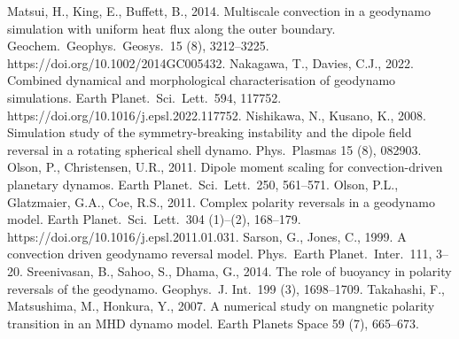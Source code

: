 \begin{thebibliography}{}
%
%
Matsui, H., King, E., Buffett, B., 2014. Multiscale convection in a geodynamo simulation with uniform heat flux along the outer boundary. Geochem.\ Geophys.\ Geosys.\ 15 (8), 3212--3225. https://doi.org/10.1002/2014GC005432.
%
%
Nakagawa, T., Davies, C.J., 2022. Combined dynamical and morphological characterisation of geodynamo simulations. Earth Planet.\ Sci.\ Lett.\ 594, 117752. https://doi.org/10.1016/j.epsl.2022.117752.
%
Nishikawa, N., Kusano, K., 2008. Simulation study of the symmetry-breaking instability and the dipole field reversal in a rotating spherical shell dynamo. Phys.\ Plasmas 15 (8), 082903.
%
%
Olson, P., Christensen, U.R., 2011. Dipole moment scaling for convection-driven planetary dynamos. Earth Planet.\ Sci.\ Lett.\ 250, 561--571.
%
Olson, P.L., Glatzmaier, G.A., Coe, R.S., 2011. Complex polarity reversals in a geodynamo model. Earth Planet.\ Sci.\ Lett.\ 304 (1)--(2), 168--179. https://doi.org/10.1016/j.epsl.2011.01.031.
%
Sarson, G., Jones, C., 1999. A convection driven geodynamo reversal model. Phys.\ Earth Planet.\ Inter.\ 111, 3--20.
%
Sreenivasan, B., Sahoo, S., Dhama, G., 2014. The role of buoyancy in polarity reversals of the geodynamo. Geophys.\ J. Int.\ 199 (3), 1698--1709.
%
Takahashi, F., Matsushima, M., Honkura, Y., 2007. A numerical study on mangnetic polarity transition in an MHD dynamo model. Earth Planets Space 59 (7), 665--673.

\end{thebibliography}
